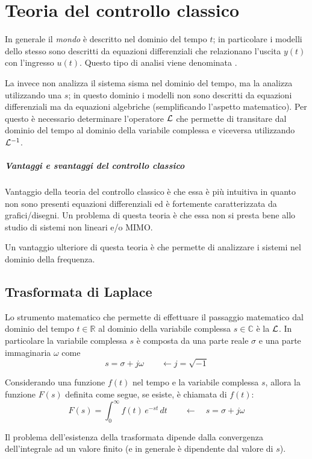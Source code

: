 \chapter{Teoria del controllo classico}
	In generale il \textit{mondo} è descritto nel dominio del tempo $t$; in particolare i modelli dello stesso sono descritti da equazioni differenziali  che relazionano l'uscita $y(t)$ con l'ingresso $u(t)$. Questo tipo di analisi viene denominata .
	
	La  invece non analizza il sistema sisma nel dominio del tempo, ma la analizza utilizzando una  $s$; in questo dominio i modelli non sono descritti da equazioni differenziali ma da equazioni algebriche (semplificando l'aspetto matematico). Per questo è necessario determinare l'operatore $\mathcal L$ che permette di transitare dal dominio del tempo al dominio della variabile complessa e viceversa utilizzando $\mathcal L^{-1}$. 
	
	\paragraph{Vantaggi e svantaggi del controllo classico} Vantaggio della teoria del controllo classico  è che essa è più intuitiva in quanto non sono presenti equazioni differenziali ed è fortemente caratterizzata da grafici/disegni. Un problema di questa teoria è che essa non si presta bene allo studio di sistemi non lineari e/o MIMO.
	
	Un vantaggio ulteriore di questa teoria è che permette di analizzare i sistemi nel dominio della frequenza.
	
\section{Trasformata di Laplace}
	Lo strumento matematico che permette di effettuare il passaggio matematico dal dominio del tempo $t\in \mathds R$ al dominio della variabile complessa $s\in \mathds C$ è la  $\mathcal L$. In particolare la variabile complessa $s$ è composta da una parte reale $\sigma$ e una parte immaginaria $\omega$ come
	\begin{equation}
		 s = \sigma  + j \omega \qquad \leftarrow j = \sqrt{-1}
	\end{equation}
	
	\begin{concetto}
		Considerando una funzione $f(t)$ nel tempo e la variabile complessa $s$, allora la funzione $F(s)$ definita come segue, 
		se esiste,   è chiamata  di $f(t)$:
		\begin{equation}
			F(s) = \int_0^\infty f(t) \, e^{-st}\, dt \qquad \leftarrow \quad s = \sigma + j\omega
		\end{equation}
	\end{concetto}
	Il problema dell'esistenza della trasformata dipende dalla convergenza dell'integrale ad un valore finito (e in generale è dipendente dal valore di $s$).
	
